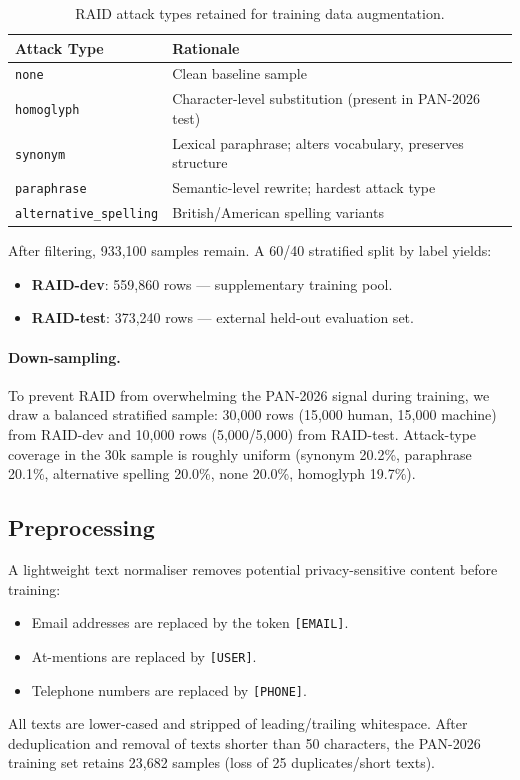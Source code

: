 \begin{table}[t]
  \caption{RAID attack types retained for training data augmentation.}
  \label{tab:attacks}
  \centering
  \begin{tabular}{ll}
    \toprule
    Attack Type & Rationale \\
    \midrule
    \texttt{none}                 & Clean baseline sample \\
    \texttt{homoglyph}            & Character-level substitution (present in PAN-2026 test) \\
    \texttt{synonym}              & Lexical paraphrase; alters vocabulary, preserves structure \\
    \texttt{paraphrase}           & Semantic-level rewrite; hardest attack type \\
    \texttt{alternative\_spelling}& British/American spelling variants \\
    \bottomrule
  \end{tabular}
\end{table}

After filtering, 933,100 samples remain.  A 60/40 stratified split by label yields:
\begin{itemize}
  \item \textbf{RAID-dev}: 559,860 rows — supplementary training pool.
  \item \textbf{RAID-test}: 373,240 rows — external held-out evaluation set.
\end{itemize}

\paragraph{Down-sampling.}
To prevent RAID from overwhelming the PAN-2026 signal during training, we draw a
balanced stratified sample: 30,000 rows (15,000 human, 15,000 machine) from RAID-dev
and 10,000 rows (5,000/5,000) from RAID-test.  Attack-type coverage in the 30k sample
is roughly uniform (synonym 20.2\%, paraphrase 20.1\%, alternative spelling 20.0\%,
none 20.0\%, homoglyph 19.7\%).

\subsection{Preprocessing}
\label{subsec:preprocess}

A lightweight text normaliser removes potential privacy-sensitive content before training:
\begin{itemize}
  \item Email addresses are replaced by the token \texttt{[EMAIL]}.
  \item At-mentions are replaced by \texttt{[USER]}.
  \item Telephone numbers are replaced by \texttt{[PHONE]}.
\end{itemize}
All texts are lower-cased and stripped of leading/trailing whitespace.  After deduplication
and removal of texts shorter than 50 characters, the PAN-2026 training set retains 23,682
samples (loss of 25 duplicates/short texts).

